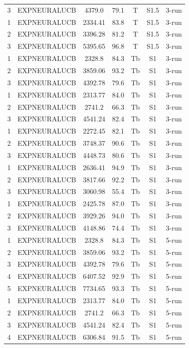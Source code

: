 \documentclass[11pt]{article}
\begin{document}
\begin{center}
\begin{longtable}{|c|c|c|c|c|c|c|}
3 & EXPNEURALUCB & 4379.0 & 79.1 & T & S1.5 & 3-run \\
1 & EXPNEURALUCB & 2334.41 & 83.8 & T & S1.5 & 3-run \\
2 & EXPNEURALUCB & 3396.28 & 81.2 & T & S1.5 & 3-run \\
3 & EXPNEURALUCB & 5395.65 & 96.8 & T & S1.5 & 3-run \\
1 & EXPNEURALUCB & 2328.8 & 84.3 & Tb & S1 & 3-run \\
2 & EXPNEURALUCB & 3859.06 & 93.2 & Tb & S1 & 3-run \\
3 & EXPNEURALUCB & 4392.78 & 79.6 & Tb & S1 & 3-run \\
1 & EXPNEURALUCB & 2313.77 & 84.0 & Tb & S1 & 3-run \\
2 & EXPNEURALUCB & 2741.2 & 66.3 & Tb & S1 & 3-run \\
3 & EXPNEURALUCB & 4541.24 & 82.4 & Tb & S1 & 3-run \\
1 & EXPNEURALUCB & 2272.45 & 82.1 & Tb & S1 & 3-run \\
2 & EXPNEURALUCB & 3748.37 & 90.6 & Tb & S1 & 3-run \\
3 & EXPNEURALUCB & 4448.73 & 80.6 & Tb & S1 & 3-run \\
1 & EXPNEURALUCB & 2636.41 & 94.9 & Tb & S1 & 3-run \\
2 & EXPNEURALUCB & 3817.66 & 92.2 & Tb & S1 & 3-run \\
3 & EXPNEURALUCB & 3060.98 & 55.4 & Tb & S1 & 3-run \\
1 & EXPNEURALUCB & 2425.78 & 87.0 & Tb & S1 & 3-run \\
2 & EXPNEURALUCB & 3929.26 & 94.0 & Tb & S1 & 3-run \\
3 & EXPNEURALUCB & 4148.86 & 74.4 & Tb & S1 & 3-run \\
1 & EXPNEURALUCB & 2328.8 & 84.3 & Tb & S1 & 5-run \\
2 & EXPNEURALUCB & 3859.06 & 93.2 & Tb & S1 & 5-run \\
3 & EXPNEURALUCB & 4392.78 & 79.6 & Tb & S1 & 5-run \\
4 & EXPNEURALUCB & 6407.52 & 92.9 & Tb & S1 & 5-run \\
5 & EXPNEURALUCB & 7734.65 & 93.3 & Tb & S1 & 5-run \\
1 & EXPNEURALUCB & 2313.77 & 84.0 & Tb & S1 & 5-run \\
2 & EXPNEURALUCB & 2741.2 & 66.3 & Tb & S1 & 5-run \\
3 & EXPNEURALUCB & 4541.24 & 82.4 & Tb & S1 & 5-run \\
4 & EXPNEURALUCB & 6306.84 & 91.5 & Tb & S1 & 5-run \\

\end{longtable}
\end{center}
\end{document}
